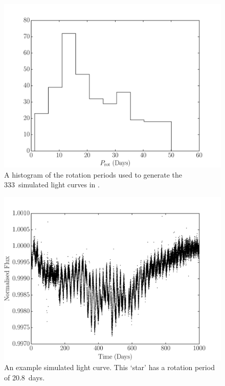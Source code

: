 \documentclass[a4paper,fleqn,usenatbib,useAMS]{mnras}
\newcommand{\naigrain}{333}
\newcommand{\aigrainexampleperiod}{20.8}
\begin{document}
\begin{figure}
\begin{center}
\includegraphics[width=\columnwidth, clip=true]{figures/period_hist.pdf}
\caption{A histogram of the rotation periods used to generate the \naigrain\
simulated light curves in \citet{Aigrain2015}.}
\label{fig:period_hist}
\end{center}
\end{figure}

\begin{figure}
\begin{center}
\includegraphics[width=\columnwidth, clip=true]{figures/demo_lc.pdf}
\caption[A simulated light curve.]
{An example simulated light curve. This `star' has a rotation period of
\aigrainexampleperiod\ days.}
\label{fig:demo_lc}
\end{center}
\end{figure}
\end{document}
